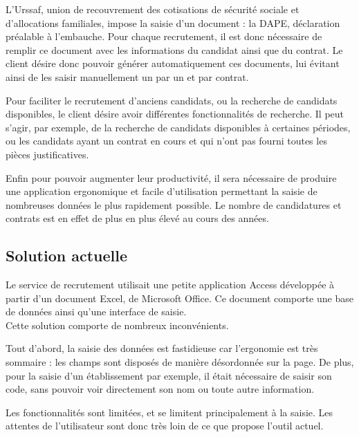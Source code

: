 L'Urssaf, union de recouvrement des cotisations de sécurité sociale et d'allocations familiales, impose la saisie d'un document : la DAPE, déclaration préalable à l'embauche.
Pour chaque recrutement, il est donc nécessaire de remplir ce document avec les informations du candidat ainsi que du contrat.
Le client désire donc pouvoir générer automatiquement ces documents, lui évitant ainsi de les saisir manuellement un par un et par contrat.

Pour faciliter le recrutement d'anciens candidats, ou la recherche de candidats disponibles, le client désire avoir différentes fonctionnalités de recherche.
Il peut s'agir, par exemple, de la recherche de candidats disponibles à certaines périodes, ou les candidats ayant un contrat en cours et qui n'ont pas fourni toutes les pièces justificatives.

Enfin pour pouvoir augmenter leur productivité, il sera nécessaire de produire une application ergonomique et facile d'utilisation permettant la saisie de nombreuses données le plus rapidement possible.
Le nombre de candidatures et contrats est en effet de plus en plus élevé au cours des années.


\subsection{Solution actuelle}

Le service de recrutement utilisait une petite application Access développée à partir d'un document Excel, de Microsoft Office.
Ce document comporte une base de données ainsi qu'une interface de saisie.
\\

Cette solution comporte de nombreux inconvénients.

Tout d'abord, la saisie des données est fastidieuse car l'ergonomie est très sommaire : les champs sont disposés de manière désordonnée sur la page.
De plus, pour la saisie d'un établissement par exemple, il était nécessaire de saisir son code, sans pouvoir voir directement son nom ou toute autre information.

Les fonctionnalités sont limitées, et se limitent principalement à la saisie.
Les attentes de l'utilisateur sont donc très loin de ce que propose l'outil actuel.

